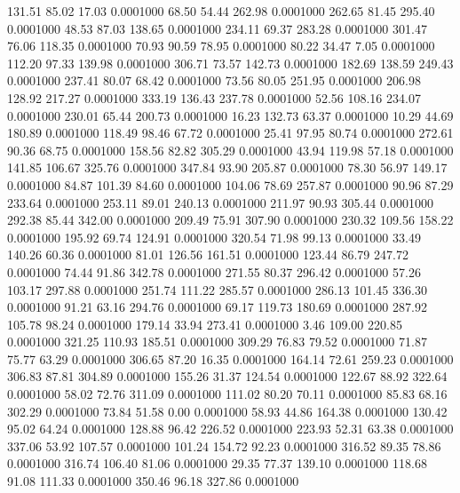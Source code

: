  131.51   85.02   17.03   0.0001000
  68.50   54.44  262.98   0.0001000
 262.65   81.45  295.40   0.0001000
  48.53   87.03  138.65   0.0001000
 234.11   69.37  283.28   0.0001000
 301.47   76.06  118.35   0.0001000
  70.93   90.59   78.95   0.0001000
  80.22   34.47    7.05   0.0001000
 112.20   97.33  139.98   0.0001000
 306.71   73.57  142.73   0.0001000
 182.69  138.59  249.43   0.0001000
 237.41   80.07   68.42   0.0001000
  73.56   80.05  251.95   0.0001000
 206.98  128.92  217.27   0.0001000
 333.19  136.43  237.78   0.0001000
  52.56  108.16  234.07   0.0001000
 230.01   65.44  200.73   0.0001000
  16.23  132.73   63.37   0.0001000
  10.29   44.69  180.89   0.0001000
 118.49   98.46   67.72   0.0001000
  25.41   97.95   80.74   0.0001000
 272.61   90.36   68.75   0.0001000
 158.56   82.82  305.29   0.0001000
  43.94  119.98   57.18   0.0001000
 141.85  106.67  325.76   0.0001000
 347.84   93.90  205.87   0.0001000
  78.30   56.97  149.17   0.0001000
  84.87  101.39   84.60   0.0001000
 104.06   78.69  257.87   0.0001000
  90.96   87.29  233.64   0.0001000
 253.11   89.01  240.13   0.0001000
 211.97   90.93  305.44   0.0001000
 292.38   85.44  342.00   0.0001000
 209.49   75.91  307.90   0.0001000
 230.32  109.56  158.22   0.0001000
 195.92   69.74  124.91   0.0001000
 320.54   71.98   99.13   0.0001000
  33.49  140.26   60.36   0.0001000
  81.01  126.56  161.51   0.0001000
 123.44   86.79  247.72   0.0001000
  74.44   91.86  342.78   0.0001000
 271.55   80.37  296.42   0.0001000
  57.26  103.17  297.88   0.0001000
 251.74  111.22  285.57   0.0001000
 286.13  101.45  336.30   0.0001000
  91.21   63.16  294.76   0.0001000
  69.17  119.73  180.69   0.0001000
 287.92  105.78   98.24   0.0001000
 179.14   33.94  273.41   0.0001000
   3.46  109.00  220.85   0.0001000
 321.25  110.93  185.51   0.0001000
 309.29   76.83   79.52   0.0001000
  71.87   75.77   63.29   0.0001000
 306.65   87.20   16.35   0.0001000
 164.14   72.61  259.23   0.0001000
 306.83   87.81  304.89   0.0001000
 155.26   31.37  124.54   0.0001000
 122.67   88.92  322.64   0.0001000
  58.02   72.76  311.09   0.0001000
 111.02   80.20   70.11   0.0001000
  85.83   68.16  302.29   0.0001000
  73.84   51.58    0.00   0.0001000
  58.93   44.86  164.38   0.0001000
 130.42   95.02   64.24   0.0001000
 128.88   96.42  226.52   0.0001000
 223.93   52.31   63.38   0.0001000
 337.06   53.92  107.57   0.0001000
 101.24  154.72   92.23   0.0001000
 316.52   89.35   78.86   0.0001000
 316.74  106.40   81.06   0.0001000
  29.35   77.37  139.10   0.0001000
 118.68   91.08  111.33   0.0001000
 350.46   96.18  327.86   0.0001000
